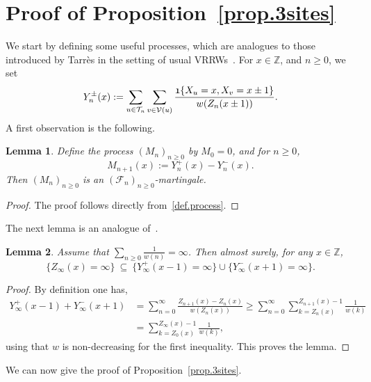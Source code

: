 \documentclass[10pt,a4paper]{amsart}
\newtheorem {lem} {Lemma} [section]
\newcommand{\1}{{\text{\Large $\mathfrak 1$}}}
\begin{document}
\section{Proof of Proposition~\ref{prop.3sites}} \label{sec:3sites}
We start by defining some useful processes, which are analogues to those introduced by Tarr\`es in the setting of usual VRRWs~\cite{T1,T2}. 
For $x\in \mathbb Z$, and $n\ge 0$, we set  
$$Y_n^\pm(x) := \sum_{u\in \mathcal T_n} \sum_{v\in\mathcal V(u)} \frac{\1\{X_u = x, X_v = x\pm 1\}}{w(Z_n(x\pm 1))}.$$
A first observation is the following. 
\begin{lem}\label{lem:martingale}
Define the process $(M_n)_{n\ge 0}$ by $M_0=0$, and for $n\ge 0$, 
$$M_{n+1}(x) := Y_n^+(x) - Y_n^-(x).$$
Then $(M_n)_{n\ge 0}$ is an $(\mathcal F_n)_{n\ge 0}$-martingale. 
\end{lem}
\begin{proof} The proof follows directly from~\eqref{def.process}. 
\end{proof} 
The next lemma is an analogue of~\cite[Corollary 2.1]{T2}. 

\begin{lem}\label{lem:Ypm}
Assume that $\sum_{n\ge 0} \tfrac 1{w(n)}=\infty$. Then almost surely, for any $x\in \mathbb Z$, 
$$\{Z_\infty(x)=\infty\}\ \subseteq\  \{Y_\infty^+(x-1)=\infty\} \cup \{ Y_\infty^-(x+1)=\infty\}.$$ 
\end{lem}
\begin{proof} By definition one has, 
\begin{align*}
 Y_\infty^+(x-1) + Y_\infty^-(x+1) & = \sum_{n=0}^\infty \frac{Z_{n+1}(x) - Z_n(x)}{w(Z_n(x))}\ge \sum_{n=0}^\infty \sum_{k=Z_n(x)}^{Z_{n+1}(x)-1} \frac 1{w(k)} \\
 & = \sum_{k=Z_0(x)}^{Z_\infty(x)-1}\frac 1{w(k)},
 \end{align*} 
using that $w$ is non-decreasing for the first inequality. This proves the lemma.
\end{proof}

We can now give the proof of Proposition~\ref{prop.3sites}. 
\end{document}
